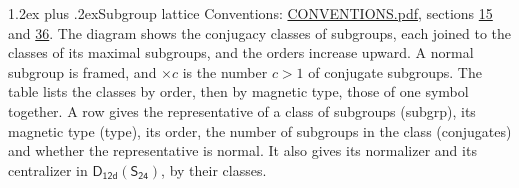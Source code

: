 \documentclass[10pt,a4paper]{article}
\makeatletter
\renewcommand\section{\@startsection{section}{1}{\z@}{-3ex plus -1ex minus -.2ex}%
  {1.2ex plus .2ex}{\normalfont\large\sffamily\bfseries\color{parttitle}}}
\numberwithin{equation}{section}
\newcommand{\grp}[1]{\mathsf{#1}}
\makeatother
\begin{document}
\section{Subgroup lattice}\label{s:subgroups}
Conventions: \href{../../CONVENTIONS.pdf}{CONVENTIONS.pdf}, sections \href{../../../rotation/CONVENTIONS.pdf\#conv.15}{15} and \href{../../CONVENTIONS.pdf\#conv.36}{36}.
The diagram shows the conjugacy classes of subgroups, each joined to the classes of its maximal subgroups, and the orders increase upward. \label{n:index.conjugates.c}\label{n:mark.conjugates}A normal subgroup is framed, and ${\times}c$ is the number $c > 1$ of conjugate subgroups. The table lists the classes by order, then by magnetic type, those of one symbol together. \label{n:head.subgroup}\label{n:head.magnetic.type}\label{n:head.order}\label{n:head.conjugates}\label{n:head.normal}A row gives the representative of a class of subgroups (subgrp), its magnetic type (type), its order, the number of subgroups in the class (conjugates) and whether the representative is normal. \label{n:head.normalizer}\label{n:head.centralizer}It also gives its normalizer and its centralizer in $\grp{D_{12d}}(\grp{S_{24}})$, by their classes. 
\end{document}
